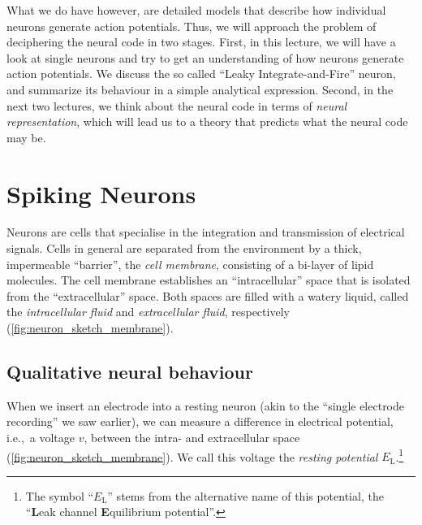 \documentclass[10pt,letterpaper,oneside]{article}
\begin{document}
What we do have however, are detailed models that describe how individual neurons generate action potentials. Thus, we will approach the problem of deciphering the neural code in two stages. First, in this lecture, we will have a look at single neurons and try to get an understanding of how neurons generate action potentials. We discuss the so called \enquote{Leaky Integrate-and-Fire} neuron, and summarize its behaviour in a simple analytical expression. Second, in the next two lectures, we think about the neural code in terms of \emph{neural representation}, which will lead us to a theory that predicts what the neural code may be.

\section{Spiking Neurons}


Neurons are cells that specialise in the integration and transmission of electrical signals. Cells in general are separated from the environment by a thick, impermeable \enquote{barrier}, the \emph{cell membrane}, consisting of a bi-layer of lipid molecules. The cell membrane establishes an \enquote{intracellular} space that is isolated from the \enquote{extracellular} space. Both spaces are filled with a watery liquid, called the \emph{intracellular fluid} and \emph{extracellular fluid}, respectively (\cref{fig:neuron_sketch_membrane}).

\subsection{Qualitative neural behaviour}

When we insert an electrode into a resting neuron (akin to the \enquote{single electrode recording} we saw earlier), we can measure a difference in electrical potential, i.e.,~a voltage $v$, between the intra- and extracellular space (\cref{fig:neuron_sketch_membrane}). We call this voltage the \emph{resting potential} $E_\mathrm{L}$.\footnote{The symbol \enquote{$E_\mathrm{L}$} stems from the alternative name of this potential, the \enquote{\textbf{L}eak channel \textbf{E}quilibrium potential}.}
\end{document}
